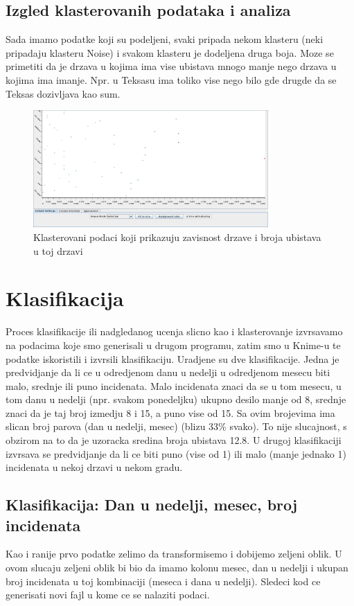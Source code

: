 \documentclass[11pt]{article} %
\begin{document}
	
	\newpage
	\subsection{Izgled klasterovanih podataka i analiza}
	Sada imamo podatke koji su podeljeni, svaki pripada nekom klasteru (neki pripadaju klasteru Noise) i svakom klasteru je dodeljena druga boja. Moze se 
	primetiti da je drzava u kojima ima vise ubistava mnogo manje nego drzava u kojima ima imanje. Npr. u Teksasu ima toliko vise nego bilo gde drugde da se 
	Teksas dozivljava kao sum.
	
	\begin{figure}[h!]
	\centering
		\includegraphics[width=0.8\textwidth]{klasterovanje1}
		\caption{Klasterovani podaci koji prikazuju zavisnost drzave i broja ubistava u toj drzavi}
	\end{figure}
	
	\newpage
	\section{Klasifikacija}
	Proces klasifikacije ili nadgledanog ucenja slicno kao i klasterovanje izvrsavamo na podacima koje smo generisali u drugom programu, zatim smo u 
	Knime-u te podatke iskoristili i izvrsili klasifikaciju. 
	Uradjene su dve klasifikacije. 
	Jedna je predvidjanje da li ce u odredjenom danu u nedelji u odredjenom mesecu biti malo, srednje ili puno incidenata. 
	Malo incidenata znaci da se u tom mesecu, u tom danu u nedelji (npr. svakom ponedeljku) ukupno desilo manje od 8, srednje znaci da je taj broj izmedju 8 i 15, 
	a puno vise od 15. Sa ovim brojevima ima slican broj parova (dan u nedelji, mesec) (blizu 33\% svako). To nije slucajnost, s obzirom na to da je 
	uzoracka sredina broja ubistava 12.8.
	U drugoj klasifikaciji izvrsava se predvidjanje da li ce biti puno (vise od 1) ili malo (manje jednako 1) incidenata u nekoj drzavi u nekom gradu.
	
	\subsection{Klasifikacija: Dan u nedelji, mesec, broj incidenata}
	Kao i ranije prvo podatke zelimo da transformisemo i dobijemo zeljeni oblik. U ovom slucaju zeljeni oblik bi bio da imamo kolonu mesec, dan u nedelji i 
	ukupan broj incidenata u toj kombinaciji (meseca i dana u nedelji). Sledeci kod ce generisati novi fajl u kome ce se nalaziti podaci.
\end{document}
